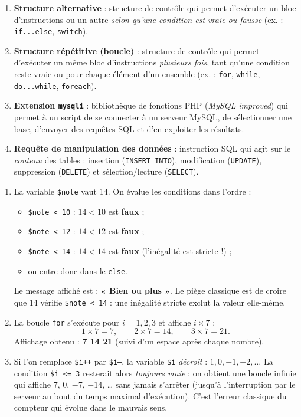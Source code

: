 \documentclass[11pt]{article}
\newcommand{\cle}[1]{{\popxbold\color{popdark}#1}}
\begin{document}
\begin{corrige}
\begin{enumerate}
\item \textbf{Structure alternative} : structure de contrôle qui permet d'exécuter un bloc d'instructions ou un autre \emph{selon qu'une condition est vraie ou fausse} (ex. : \texttt{if...else}, \texttt{switch}).
\item \textbf{Structure répétitive (boucle)} : structure de contrôle qui permet d'exécuter un même bloc d'instructions \emph{plusieurs fois}, tant qu'une condition reste vraie ou pour chaque élément d'un ensemble (ex. : \texttt{for}, \texttt{while}, \texttt{do...while}, \texttt{foreach}).
\item \textbf{Extension \texttt{mysqli}} : bibliothèque de fonctions PHP (\emph{MySQL improved}) qui permet à un script de se connecter à un serveur MySQL, de sélectionner une base, d'envoyer des requêtes SQL et d'en exploiter les résultats.
\item \textbf{Requête de manipulation des données} : instruction SQL qui agit sur le \emph{contenu} des tables : insertion (\texttt{INSERT INTO}), modification (\texttt{UPDATE}), suppression (\texttt{DELETE}) et sélection/lecture (\texttt{SELECT}).
\end{enumerate}
\end{corrige}

\begin{corrige}
\begin{enumerate}
\item La variable \texttt{\$note} vaut 14. On évalue les conditions dans l'ordre :
\begin{itemize}
\item \texttt{\$note < 10} : $14 < 10$ est \textbf{faux} ;
\item \texttt{\$note < 12} : $14 < 12$ est \textbf{faux} ;
\item \texttt{\$note < 14} : $14 < 14$ est \textbf{faux} (l'inégalité est stricte !) ;
\item on entre donc dans le \texttt{else}.
\end{itemize}
Le message affiché est : \textbf{« Bien ou plus »}. Le piège classique est de croire que 14 vérifie \texttt{\$note < 14} : une inégalité stricte exclut la valeur elle-même.
\item La boucle \texttt{for} s'exécute pour $i = 1, 2, 3$ et affiche $i \times 7$ :
\[ 1 \times 7 = 7, \qquad 2 \times 7 = 14, \qquad 3 \times 7 = 21. \]
Affichage obtenu : \textbf{7 14 21} (suivi d'un espace après chaque nombre).
\item Si l'on remplace \texttt{\$i++} par \texttt{\$i--}, la variable \texttt{\$i} \emph{décroît} : $1, 0, -1, -2, \dots$ La condition \texttt{\$i <= 3} resterait alors \emph{toujours vraie} : on obtient une \cle{boucle infinie} qui affiche 7, 0, $-7$, $-14$, \dots{} sans jamais s'arrêter (jusqu'à l'interruption par le serveur au bout du temps maximal d'exécution). C'est l'erreur classique du compteur qui évolue dans le mauvais sens.
\end{enumerate}
\end{corrige}
\end{document}
